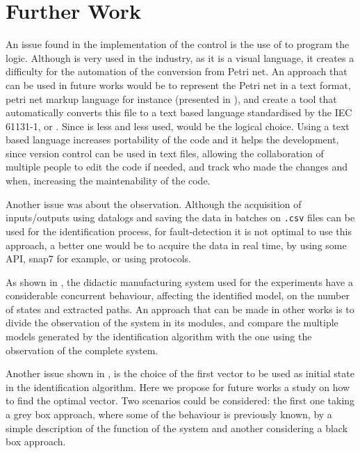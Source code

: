 \section{Further Work}
An issue found in the implementation of the control is the use of \LD{} to
program the logic. Although \LD{} is very used
in the industry, as it is a visual language, it creates a difficulty for the
automation of the conversion from Petri net. An approach that can be used in
future works would be to represent the Petri net in a text format, petri net
markup language for instance (presented in \cite{weber2003petri}), and create a
tool that automatically converts this file to a text based language standardised
by the IEC 61131-1, \IL{} or \ST{}. Since \IL{} is less and less used, \ST{}
would be the logical choice. Using a text based language increases portability
of the code and it helps the development, since version control can be used in
text files, allowing the collaboration of multiple people to edit the code if
needed, and track who made the changes and when, increasing the maintenability
of the code.



Another issue was about the observation. Although the acquisition of
inputs\slash outputs using datalogs and saving the data in batches on
\verb|.csv| files can be used for the identification process, for
fault-detection it is not optimal to use this approach, a better one would be to
acquire the data in real time, by using some API, snap7 for example, or using
\SCADA{} protocols.

As shown in , the didactic manufacturing system used for the
experiments have a considerable concurrent behaviour, affecting the identified
model, on the number of states and extracted paths. An approach that can be made
in other works is to divide the observation of the system in its modules, and
compare the multiple models generated by the identification algorithm with the
one using the observation of the complete system.

Another issue shown in , is the choice of the first
vector to be used as initial state in the identification algorithm. Here we
propose for future works a study on how to find the optimal vector. Two
scenarios could be considered: the first one taking a grey box approach, where some of the behaviour
is previously known, by a simple description of the function of the system and another considering a black box approach.

